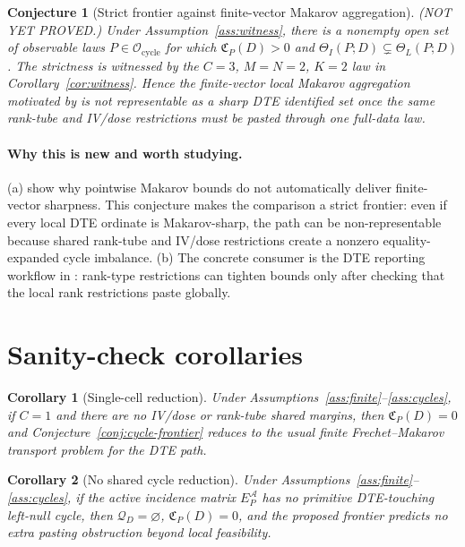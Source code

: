 \documentclass[11pt]{article}
\theoremstyle{definition}
\theoremstyle{plain}
\newtheorem{conjecture}{Conjecture}
\newtheorem{corollary}{Corollary}
\theoremstyle{remark}
\begin{document}
\begin{conjecture}[Strict frontier against finite-vector Makarov aggregation]\label{conj:firpo-frontier}
(NOT YET PROVED.)  Under Assumption~\ref{ass:witness}, there is a nonempty open
set of observable laws \(P\in\mathcal O_{\mathrm{cycle}}\) for which
\(\mathfrak C_P(D)>0\) and \(\Theta_I(P;D)\subsetneq\Theta_L(P;D)\).  The
strictness is witnessed by the \(C=3\), \(M=N=2\), \(K=2\) law in
Corollary~\ref{cor:witness}.  Hence the finite-vector local Makarov aggregation
motivated by \citet[Section 2, equations (2.1)--(2.4)]{FirpoRidder2019} is not
representable as a sharp DTE identified set once the same rank-tube and
IV/dose restrictions must be pasted through one full-data law.
\end{conjecture}

\paragraph{Why this is new and worth studying.}
(a) \citet[Section 2, equations (2.1)--(2.4)]{FirpoRidder2019} show why
pointwise Makarov bounds do not automatically deliver finite-vector sharpness.
This conjecture makes the comparison a strict frontier: even if every local
DTE ordinate is Makarov-sharp, the path can be non-representable because shared
rank-tube and IV/dose restrictions create a nonzero equality-expanded cycle
imbalance.  (b) The concrete consumer is the DTE reporting workflow in
\citet{FrandsenLefgren2021}:
rank-type restrictions can tighten bounds only after checking that the local
rank restrictions paste globally.

\section{Sanity-check corollaries}
\begin{corollary}[Single-cell reduction]\label{cor:single}
Under Assumptions~\ref{ass:finite}--\ref{ass:cycles}, if \(C=1\) and there are
no IV/dose or rank-tube shared margins, then \(\mathfrak C_P(D)=0\) and
Conjecture~\ref{conj:cycle-frontier} reduces to the usual finite
Frechet--Makarov transport problem for the DTE path.
\end{corollary}

\begin{corollary}[No shared cycle reduction]\label{cor:forest}
Under Assumptions~\ref{ass:finite}--\ref{ass:cycles}, if the active incidence
matrix \(E_P^{\mathcal A}\) has no primitive DTE-touching left-null cycle, then
\(\mathcal Q_D=\varnothing\),
\(\mathfrak C_P(D)=0\), and the proposed frontier predicts no extra pasting
obstruction beyond local feasibility.
\end{corollary}
\end{document}
